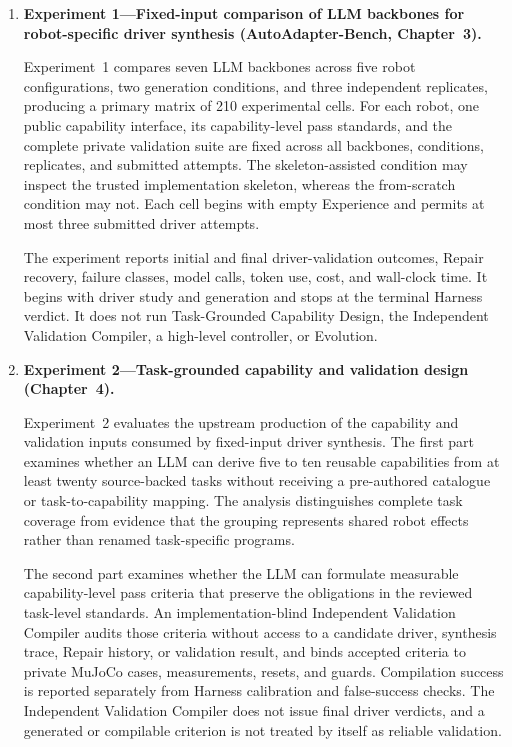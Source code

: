 \begin{enumerate}[leftmargin=*,itemsep=1em]
    \item \textbf{Experiment 1---Fixed-input comparison of LLM backbones for
    robot-specific driver synthesis (AutoAdapter-Bench, Chapter~3).}

    Experiment~1 compares seven LLM backbones across five robot configurations,
    two generation conditions, and three independent replicates, producing a
    primary matrix of 210 experimental cells. For each robot, one public
    capability interface, its capability-level pass standards, and the complete
    private validation suite are fixed across all backbones, conditions,
    replicates, and submitted attempts. The skeleton-assisted condition may
    inspect the trusted implementation skeleton, whereas the from-scratch
    condition may not. Each cell begins with empty Experience and permits at
    most three submitted driver attempts.

    The experiment reports initial and final driver-validation outcomes, Repair
    recovery, failure classes, model calls, token use, cost, and wall-clock
    time. It begins with driver study and generation and stops at the terminal
    Harness verdict. It does not run Task-Grounded Capability Design, the
    Independent Validation Compiler, a high-level controller, or Evolution.

    \item \textbf{Experiment 2---Task-grounded capability and validation
    design (Chapter~4).}

    Experiment~2 evaluates the upstream production of the capability and
    validation inputs consumed by fixed-input driver synthesis. The first part
    examines whether an LLM can derive five to ten reusable capabilities from
    at least twenty source-backed tasks without receiving a pre-authored
    catalogue or task-to-capability mapping. The analysis distinguishes
    complete task coverage from evidence that the grouping represents shared
    robot effects rather than renamed task-specific programs.

    The second part examines whether the LLM can formulate measurable
    capability-level pass criteria that preserve the obligations in the
    reviewed task-level standards. An implementation-blind Independent
    Validation Compiler audits those criteria without access to a candidate
    driver, synthesis trace, Repair history, or validation result, and binds
    accepted criteria to private MuJoCo cases, measurements, resets, and
    guards. Compilation success is reported separately from Harness calibration
    and false-success checks. The Independent Validation Compiler does not issue
    final driver verdicts, and a generated or compilable criterion is not
    treated by itself as reliable validation.


\end{enumerate}
